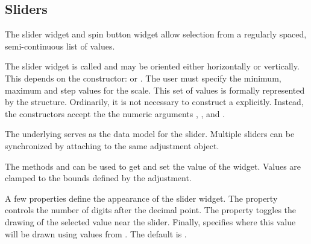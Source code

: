 
\subsection{Sliders}
\label{sec:RGtk2:sliders}

The slider widget and spin button widget allow selection from a
regularly spaced, semi-continuous list of values.

The slider widget is called  and may be oriented
either horizontally or vertically. This depends on the constructor:
 or .  The user must
specify the minimum, maximum and step values for the scale.  This set
of values is formally represented by the 
structure. Ordinarily, it is not necessary to construct a
 explicitly. Instead, the constructors accept the
the numeric arguments , ,
and .

The underlying  serves as the data model for the
slider. Multiple sliders can be synchronized by attaching to the same
adjustment object.

The methods  and
 can be used to get and set the value of
the widget. Values are clamped to the bounds defined by the
adjustment.

A few properties define the appearance of the slider widget.  The
 property controls the number of digits after the decimal
point.  The property  toggles the drawing of the
selected value near the slider. Finally, 
specifies where this value will be drawn using values from
. The default is .

